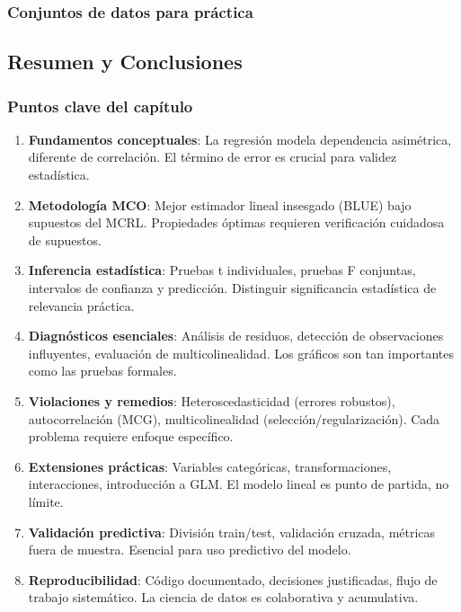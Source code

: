\documentclass[
  oneside]{book}
\begin{document}
\subsubsection{Conjuntos de datos para práctica}\label{conjuntos-de-datos-para-pruxe1ctica}

\subsection{Resumen y Conclusiones}\label{resumen-y-conclusiones}

\subsubsection{Puntos clave del capítulo}\label{puntos-clave-del-capuxedtulo}

\begin{enumerate}
\def\labelenumi{\arabic{enumi}.}
\item
  \textbf{Fundamentos conceptuales}: La regresión modela dependencia asimétrica, diferente de correlación. El término de error es crucial para validez estadística.
\item
  \textbf{Metodología MCO}: Mejor estimador lineal insesgado (BLUE) bajo supuestos del MCRL. Propiedades óptimas requieren verificación cuidadosa de supuestos.
\item
  \textbf{Inferencia estadística}: Pruebas t individuales, pruebas F conjuntas, intervalos de confianza y predicción. Distinguir significancia estadística de relevancia práctica.
\item
  \textbf{Diagnósticos esenciales}: Análisis de residuos, detección de observaciones influyentes, evaluación de multicolinealidad. Los gráficos son tan importantes como las pruebas formales.
\item
  \textbf{Violaciones y remedios}: Heteroscedasticidad (errores robustos), autocorrelación (MCG), multicolinealidad (selección/regularización). Cada problema requiere enfoque específico.
\item
  \textbf{Extensiones prácticas}: Variables categóricas, transformaciones, interacciones, introducción a GLM. El modelo lineal es punto de partida, no límite.
\item
  \textbf{Validación predictiva}: División train/test, validación cruzada, métricas fuera de muestra. Esencial para uso predictivo del modelo.
\item
  \textbf{Reproducibilidad}: Código documentado, decisiones justificadas, flujo de trabajo sistemático. La ciencia de datos es colaborativa y acumulativa.
\end{enumerate}
\end{document}
